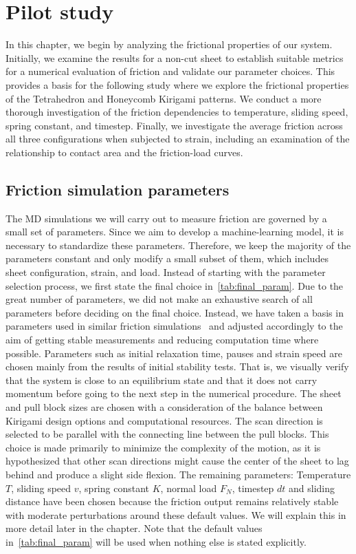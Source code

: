 \chapter{Pilot study}\label{chap:pilot_study}
In this chapter, we begin by analyzing the frictional properties of our system. Initially, we examine the results for a non-cut sheet to establish suitable metrics for a numerical evaluation of friction and validate our parameter choices. This provides a basis for the following study where we explore the frictional properties of the Tetrahedron and Honeycomb Kirigami patterns. We conduct a more thorough investigation of the friction dependencies to temperature, sliding speed, spring constant, and timestep. Finally, we investigate the average friction across all three configurations when subjected to strain, including an examination of the relationship to contact area and the friction-load curves.


\section{Friction simulation parameters}
The \acrshort{MD} simulations we will carry out to measure friction are governed
by a small set of parameters. Since we aim to develop a machine-learning model,
it is necessary to standardize these parameters. Therefore, we keep the majority
of the parameters constant and only modify a small subset of them, which
includes sheet configuration, strain, and load. Instead of starting with the
parameter selection process, we first state the final choice
in~\cref{tab:final_param}. Due to the great number of parameters, we did not
make an exhaustive search of all parameters before deciding on the final choice.
Instead, we have taken a basis in parameters used in similar friction
simulations~\cite{li_evolving_2016, Yoon2015MolecularDS, liu_high-speed_2014,
zhu_study_2018, ma12091425} and adjusted accordingly to the aim of getting
stable measurements and reducing computation time where possible. Parameters
such as initial relaxation time, pauses and strain speed are chosen mainly from
the results of initial stability tests. That is, we visually verify that the
system is close to an equilibrium state and that it does not carry momentum
before going to the next step in the numerical procedure. The sheet and pull
block sizes are chosen with a consideration of the balance between Kirigami
design options and computational resources. The scan direction is selected to be
parallel with the connecting line between the pull blocks. This choice is made
primarily to minimize the complexity of the motion, as it is hypothesized that
other scan directions might cause the center of the sheet to lag behind and
produce a slight side flexion. The remaining
parameters: Temperature $T$, sliding speed $v$, spring constant
$K$, normal load $F_N$, timestep $dt$ and sliding distance have been chosen
because the friction output remains relatively stable with moderate
perturbations around these default values. We will explain this in more detail
later in the chapter. Note that the default values in~\cref{tab:final_param}
will be used when nothing else is stated explicitly.



